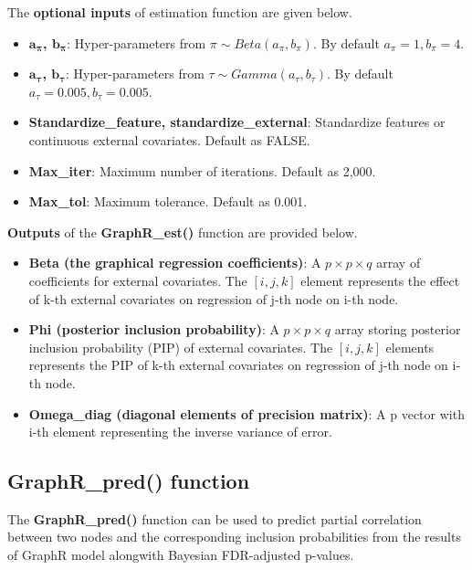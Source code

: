 \documentclass[
]{book}
\begin{document}
The \textbf{optional inputs} of estimation function are given below.

\begin{itemize}
\item
  \textbf{\(\boldsymbol a_{\boldsymbol \pi}\), \(\boldsymbol b_{\boldsymbol \pi}\)}: Hyper-parameters from \(\pi \sim Beta(a_\pi, b_\pi)\). By default \(a_\pi = 1, b_\pi = 4\).
\item
  \textbf{\(\boldsymbol a_{\boldsymbol \tau}\), \(\boldsymbol b_{\boldsymbol \tau}\)}: Hyper-parameters from \(\tau \sim Gamma(a_\tau, b_\tau)\). By default \(a_\tau = 0.005, b_\tau = 0.005\).
\item
  \textbf{Standardize\_feature, standardize\_external}: Standardize features or continuous external covariates. Default as FALSE.
\item
  \textbf{Max\_iter}: Maximum number of iterations. Default as 2,000.
\item
  \textbf{Max\_tol}: Maximum tolerance. Default as 0.001.
\end{itemize}

\textbf{Outputs} of the \textbf{GraphR\_est()} function are provided below.

\begin{itemize}
\item
  \textbf{Beta (the graphical regression coefficients)}: A \(p \times p \times q\) array of coefficients for external covariates. The \([i,j,k]\) element represents the effect of k-th external covariates on regression of j-th node on i-th node.
\item
  \textbf{Phi (posterior inclusion probability)}: A \(p \times p \times q\) array storing posterior inclusion probability (PIP) of external covariates. The \([i,j,k]\) elements represents the PIP of k-th external covariates on regression of j-th node on i-th node.
\item
  \textbf{Omega\_diag (diagonal elements of precision matrix)}: A p vector with i-th element representing the inverse variance of error.
\end{itemize}

\hypertarget{graphr_pred-function}{%
\subsection{GraphR\_pred() function}\label{graphr_pred-function}}

The \textbf{GraphR\_pred()} function can be used to predict partial correlation between two nodes and the corresponding inclusion probabilities from the results of GraphR model alongwith Bayesian FDR-adjusted p-values.
\end{document}
